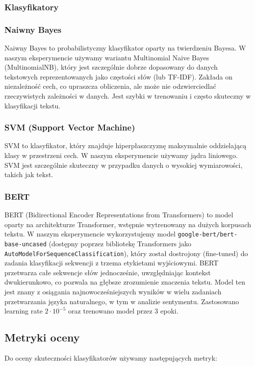 \documentclass[runningheads]{llncs}
\begin{document}
\subsubsection{Klasyfikatory}

\subsubsection{Naiwny Bayes}
Naiwny Bayes to probabilistyczny klasyfikator oparty na twierdzeniu Bayesa. W naszym eksperymencie używamy wariantu Multinomial Naive Bayes (MultinomialNB), który jest szczególnie dobrze dopasowany do danych tekstowych reprezentowanych jako częstości słów (lub TF-IDF). Zakłada on niezależność cech, co upraszcza obliczenia, ale może nie odzwierciedlać rzeczywistych zależności w danych. Jest szybki w trenowaniu i często skuteczny w klasyfikacji tekstu.

\subsubsection{SVM (Support Vector Machine)}
SVM to klasyfikator, który znajduje hiperpłaszczyznę maksymalnie oddzielającą klasy w przestrzeni cech. W naszym eksperymencie używamy jądra liniowego. SVM jest szczególnie skuteczny w przypadku danych o wysokiej wymiarowości, takich jak tekst.

\subsubsection{BERT}
BERT (Bidirectional Encoder Representations from Transformers) to model oparty na architekturze Transformer, wstępnie wytrenowany na dużych korpusach tekstu. W naszym eksperymencie wykorzystujemy model \texttt{google-bert/bert-base-uncased} (dostępny poprzez bibliotekę Transformers jako \texttt{AutoModelForSequenceClassification}), który został dostrojony (fine-tuned) do zadania klasyfikacji sekwencji z trzema etykietami wyjściowymi. BERT przetwarza całe sekwencje słów jednocześnie, uwzględniając kontekst dwukierunkowo, co pozwala na głębsze zrozumienie znaczenia tekstu. Model ten jest znany z osiągania najnowocześniejszych wyników w wielu zadaniach przetwarzania języka naturalnego, w tym w analizie sentymentu. Zastosowano learning rate $2 \cdot 10^{-5}$ oraz trenowano model przez 3 epoki.

\subsection{Metryki oceny}
Do oceny skuteczności klasyfikatorów używamy następujących metryk:
\end{document}
